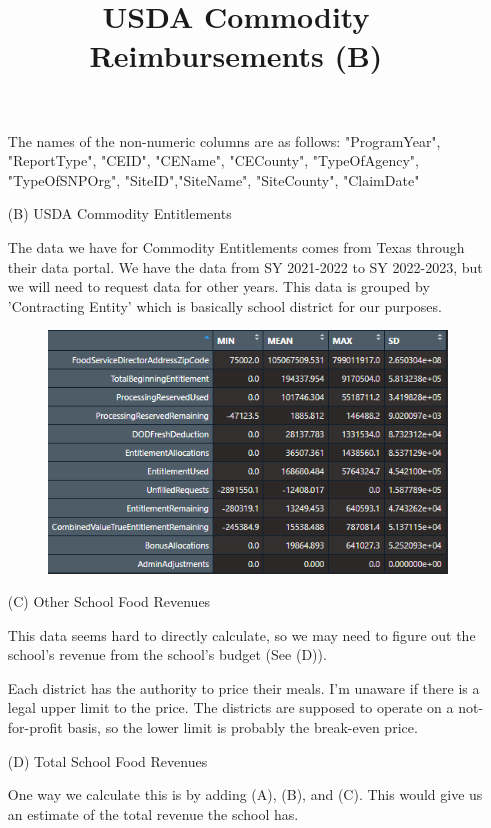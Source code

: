 \documentclass[12pt]{article}
\begin{document}
\begin{enumerate}
	The names of the non-numeric columns are as follows: "ProgramYear", "ReportType", "CEID", "CEName", "CECounty", "TypeOfAgency", "TypeOfSNPOrg", "SiteID","SiteName", "SiteCounty", "ClaimDate"
	
	\item[(B)] USDA Commodity Entitlements 
	
	The data we have for Commodity Entitlements comes from Texas through their data portal. We have the data from SY 2021-2022 to SY 2022-2023, but we will need to request data for other years. This data is grouped by 'Contracting Entity' which is basically school district for our purposes.
	
	\begin{figure}
		\centering
		\includegraphics[width = \linewidth, keepaspectratio] {"summary_stats_B.png"}
		\title{USDA Commodity Reimbursements (B)}
	\end{figure}
	
	\item[(C)] Other School Food Revenues
	
	This data seems hard to directly calculate, so we may need to figure out the school's revenue from the school's budget (See (D)). 
	
	Each district has the authority to price their meals. I'm unaware if there is a legal upper limit to the price. The districts are supposed to operate on a not-for-profit basis, so the lower limit is probably the break-even price.
	
	\item[(D)] Total School Food Revenues
	
	One way we calculate this is by adding (A), (B), and (C). This would give us an estimate of the total revenue the school has.
	

\end{enumerate}
\end{document}
